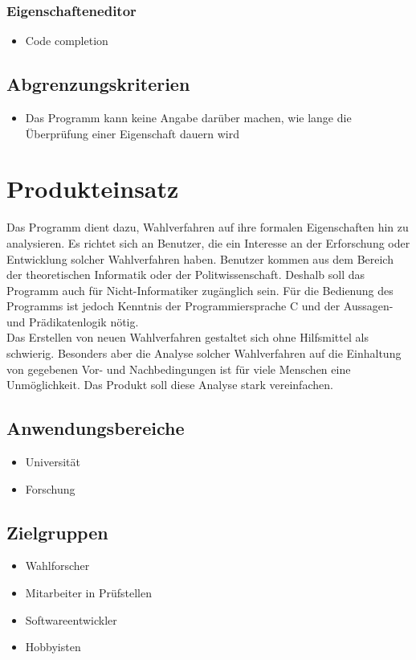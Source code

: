 \documentclass[a4paper]{scrreprt}
\begin{document}
\subsection{Eigenschafteneditor}
\begin{itemize}
\item Code completion
\end{itemize}


\section{Abgrenzungskriterien}
\begin{itemize}
\item Das Programm kann keine Angabe darüber machen, wie lange die Überprüfung einer Eigenschaft dauern wird
\end{itemize}



\chapter{Produkteinsatz}
Das Programm dient dazu, Wahlverfahren auf ihre formalen Eigenschaften hin zu analysieren. Es richtet sich an Benutzer, die ein Interesse an der Erforschung oder Entwicklung solcher Wahlverfahren haben. Benutzer kommen aus dem Bereich der theoretischen Informatik oder der Politwissenschaft. Deshalb soll das Programm auch für Nicht-Informatiker zugänglich sein. Für die Bedienung des Programms ist jedoch Kenntnis der Programmiersprache C und der Aussagen- und Prädikatenlogik nötig.\\
Das Erstellen von neuen Wahlverfahren gestaltet sich ohne Hilfsmittel als schwierig. Besonders aber die Analyse solcher Wahlverfahren auf die Einhaltung von gegebenen Vor- und Nachbedingungen ist für viele Menschen eine Unmöglichkeit. Das Produkt soll diese Analyse stark vereinfachen.\\

\section{Anwendungsbereiche}
\begin{itemize}
\item Universität
\item Forschung
\end{itemize}

\section{Zielgruppen}
\begin{itemize}
\item Wahlforscher
\item Mitarbeiter in Prüfstellen
\item Softwareentwickler
\item Hobbyisten
\end{itemize}
\end{document}
